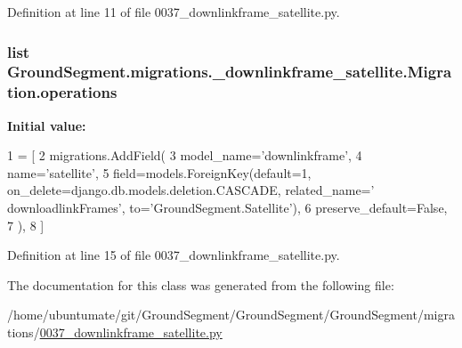 Definition at line 11 of file 0037\+\_\+downlinkframe\+\_\+satellite.\+py.

\hypertarget{class_ground_segment_1_1migrations_1_10037__downlinkframe__satellite_1_1_migration_a5d0cc4a7feefa1ecf4c44e655d2f58af}{}
\subsubsection[{operations}]{\setlength{\rightskip}{0pt plus 5cm}list Ground\+Segment.\+migrations.\+\_\+downlinkframe\+\_\+satellite.\+Migration.\+operations\hspace{0.3cm}{\ttfamily [static]}}\label{class_ground_segment_1_1migrations_1_10037__downlinkframe__satellite_1_1_migration_a5d0cc4a7feefa1ecf4c44e655d2f58af}
{\bfseries Initial value\+:}
\begin{DoxyCode}
1 = [
2         migrations.AddField(
3             model\_name=\textcolor{stringliteral}{'downlinkframe'},
4             name=\textcolor{stringliteral}{'satellite'},
5             field=models.ForeignKey(default=1, on\_delete=django.db.models.deletion.CASCADE, related\_name=\textcolor{stringliteral}{'
      downloadlinkFrames'}, to=\textcolor{stringliteral}{'GroundSegment.Satellite'}),
6             preserve\_default=\textcolor{keyword}{False},
7         ),
8     ]
\end{DoxyCode}


Definition at line 15 of file 0037\+\_\+downlinkframe\+\_\+satellite.\+py.



The documentation for this class was generated from the following file\+:\begin{DoxyCompactItemize}
\item 
/home/ubuntumate/git/\+Ground\+Segment/\+Ground\+Segment/\+Ground\+Segment/migrations/\hyperlink{0037__downlinkframe__satellite_8py}{0037\+\_\+downlinkframe\+\_\+satellite.\+py}\end{DoxyCompactItemize}
